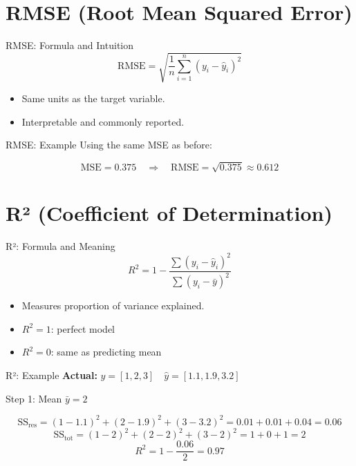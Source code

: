 \documentclass{beamer}
\begin{document}
\section{RMSE (Root Mean Squared Error)}

\begin{frame}{RMSE: Formula and Intuition}
\[
\text{RMSE} = \sqrt{\frac{1}{n} \sum_{i=1}^{n}(y_i - \hat{y}_i)^2}
\]

\begin{itemize}
  \item Same units as the target variable.
  \item Interpretable and commonly reported.
\end{itemize}
\end{frame}

\begin{frame}{RMSE: Example}
Using the same MSE as before:

\[
\text{MSE} = 0.375 \quad \Rightarrow \quad \text{RMSE} = \sqrt{0.375} \approx 0.612
\]
\end{frame}

\section{R² (Coefficient of Determination)}

\begin{frame}{R²: Formula and Meaning}
\[
R^2 = 1 - \frac{\sum (y_i - \hat{y}_i)^2}{\sum (y_i - \bar{y})^2}
\]

\begin{itemize}
  \item Measures proportion of variance explained.
  \item \( R^2 = 1 \): perfect model
  \item \( R^2 = 0 \): same as predicting mean
\end{itemize}
\end{frame}

\begin{frame}{R²: Example}
\textbf{Actual:} \( y = [1, 2, 3] \quad \hat{y} = [1.1, 1.9, 3.2] \)

\vspace{0.3cm}
Step 1: Mean \( \bar{y} = 2 \)

\vspace{0.3cm}
\[
\text{SS}_{\text{res}} = (1-1.1)^2 + (2-1.9)^2 + (3-3.2)^2 = 0.01 + 0.01 + 0.04 = 0.06
\]
\[
\text{SS}_{\text{tot}} = (1-2)^2 + (2-2)^2 + (3-2)^2 = 1 + 0 + 1 = 2
\]
\[
R^2 = 1 - \frac{0.06}{2} = 0.97
\]
\end{frame}
\end{document}
